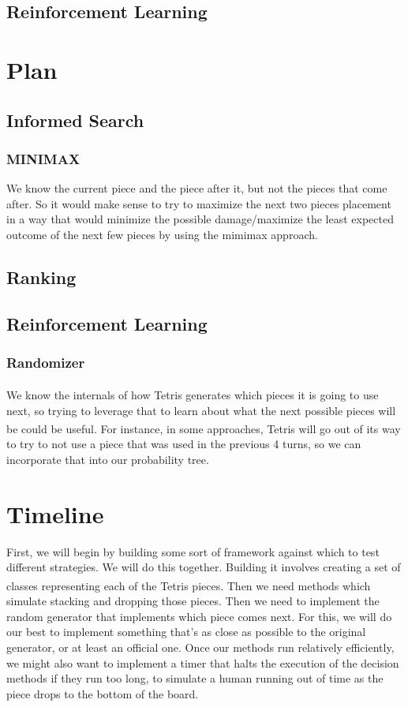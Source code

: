\documentclass{article}
\def\tetris{Tetris\textsuperscript{\textregistered}}
\begin{document}
\subsection{Reinforcement Learning}

\section{Plan}

\subsection{Informed Search}
\subsubsection{MINIMAX} We know the current piece and the piece after it, but not the pieces that come after. So it would make sense to try to maximize the next two pieces placement in a way that would minimize the possible damage/maximize the least expected outcome of the next few pieces by using the mimimax approach.


\subsection{Ranking}
\subsubsection{}

\subsection{Reinforcement Learning}
\subsubsection{Randomizer} We know the internals of how \tetris{} generates which pieces it is going to use next, so trying to leverage that to learn about what the next possible pieces will be could be useful. For instance, in some approaches, \tetris{} will go out of its way to try to not use a piece that was used in the previous 4 turns, so we can incorporate that into our probability tree.
\section{Timeline}

\par First, we will begin by building some sort of framework against which to test different strategies. We will do this together. Building it involves creating a set of classes representing each of the \tetris{} pieces. Then we need methods which simulate stacking and dropping those pieces. Then we need to implement the random generator that implements which piece comes next. For this, we will do our best to implement something that's as close as possible to the original generator, or at least an official one. Once our methods run relatively efficiently, we might also want to implement a timer that halts the execution of the decision methods if they run too long, to simulate a human running out of time as the piece drops to the bottom of the board.
\end{document}
